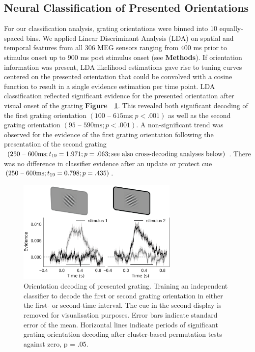 \documentclass{article}
\begin{document}
\begin{large}
\subsection{Neural Classification of Presented Orientations}
For our classification analysis, grating orientations were binned into 10 equally-spaced bins. We applied Linear Discriminant Analysis (LDA) on spatial and temporal features from all 306 MEG sensors ranging from 400 ms prior to stimulus onset up to 900 ms post stimulus onset (see \textbf{Methods}). If orientation information was present, LDA likelihood estimations gave rise to tuning curves centered on the presented orientation that could be convolved with a cosine function to result in a single evidence estimation per time point. LDA classification reflected significant evidence for the presented orientation after visual onset of the grating \textbf{Figure ~\ref{fig:decoding}}. This revealed both significant decoding of the first grating orientation $(100 \text{ – } 615 \text{ms}; p < .001)$ as well as the second grating orientation $(95 \text{ – } 590 \text{ms}; p < .001)$. A non-significant trend was observed for the evidence of the first grating orientation following the presentation of the second grating $(250 \text{ – } 600 \text{ms}; t\textsubscript{19} = 1.971; p = .063; \text{see also cross-decoding analyses below})$. There was no difference in classifier evidence after an update or protect cue $(250 \text{ – } 600 \text{ms}; t\textsubscript{19} = 0.798; p = .435)$. \\


\begin{figure}
\centering\includegraphics[width=0.7\textwidth]{figures/figure4_decoding} 
\caption[Orientation decoding of presented grating.]{Orientation decoding of presented grating. Training an independent classifier to decode the first or second grating orientation in either the first- or second-time interval. The cue in the second display is removed for visualisation purposes. Error bars indicate standard error of the mean. Horizontal lines indicate periods of significant grating orientation decoding after cluster-based permutation tests against zero, p = .05.}
\label{fig:decoding}\end{figure}



\end{large}
\end{document}
